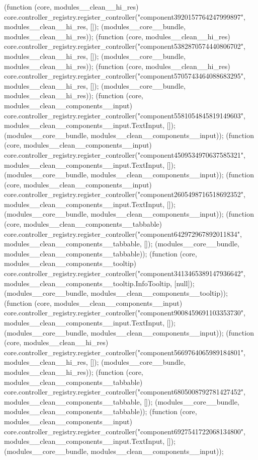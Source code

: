{{(function (core, modules__clean__hi_res) { core.controller_registry.register_controller("component3920157764247999897", modules__clean__hi_res, []); }(modules__core__bundle, modules__clean__hi_res));
(function (core, modules__clean__hi_res) { core.controller_registry.register_controller("component5382870574440806702", modules__clean__hi_res, []); }(modules__core__bundle, modules__clean__hi_res));
(function (core, modules__clean__hi_res) { core.controller_registry.register_controller("component5705743464088683295", modules__clean__hi_res, []); }(modules__core__bundle, modules__clean__hi_res));
(function (core, modules__clean__components__input) { core.controller_registry.register_controller("component5581054845819149603", modules__clean__components__input.TextInput, []); }(modules__core__bundle, modules__clean__components__input));
(function (core, modules__clean__components__input) { core.controller_registry.register_controller("component4509534970637585321", modules__clean__components__input.TextInput, []); }(modules__core__bundle, modules__clean__components__input));
(function (core, modules__clean__components__input) { core.controller_registry.register_controller("component2605498716518692352", modules__clean__components__input.TextInput, []); }(modules__core__bundle, modules__clean__components__input));
(function (core, modules__clean__components__tabbable) { core.controller_registry.register_controller("component642972967892011834", modules__clean__components__tabbable, []); }(modules__core__bundle, modules__clean__components__tabbable));
(function (core, modules__clean__components__tooltip) { core.controller_registry.register_controller("component3413465389147936642", modules__clean__components__tooltip.InfoTooltip, [null]); }(modules__core__bundle, modules__clean__components__tooltip));
(function (core, modules__clean__components__input) { core.controller_registry.register_controller("component9008459691103353730", modules__clean__components__input.TextInput, []); }(modules__core__bundle, modules__clean__components__input));
(function (core, modules__clean__hi_res) { core.controller_registry.register_controller("component5669764065989184801", modules__clean__hi_res, []); }(modules__core__bundle, modules__clean__hi_res));
(function (core, modules__clean__components__tabbable) { core.controller_registry.register_controller("component6805008792781427452", modules__clean__components__tabbable, []); }(modules__core__bundle, modules__clean__components__tabbable));
(function (core, modules__clean__components__input) { core.controller_registry.register_controller("component6927541722068134800", modules__clean__components__input.TextInput, []); }(modules__core__bundle, modules__clean__components__input));
}}
